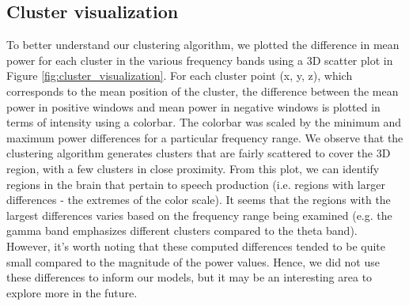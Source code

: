 \documentclass[format=sigconf, nonacm=true, review=true, screen=true]{acmart}
\begin{document}
\subsection{Cluster visualization}
To better understand our clustering algorithm, we plotted the difference in mean power for each cluster in the various frequency bands using a 3D scatter plot in Figure \ref{fig:cluster_visualization}. For each cluster point (x, y, z), which corresponds to the mean position of the cluster, the difference between the mean  power in positive windows and mean power in negative windows is plotted in terms of intensity using a colorbar. The colorbar was scaled by the minimum and maximum power differences for a particular frequency range. We observe that the clustering algorithm generates clusters that are fairly scattered to cover the 3D region, with a few clusters in close proximity. From this plot, we can identify regions in the brain that pertain to speech production (i.e. regions with larger differences - the extremes of the color scale). It seems that the regions with the largest differences varies based on the frequency range being examined (e.g. the gamma band emphasizes different clusters compared to the theta band). However, it's worth noting that these computed differences tended to be quite small compared to the magnitude of the power values. Hence, we did not use these differences to inform our models, but it may be an interesting area to explore more in the future.
\end{document}
